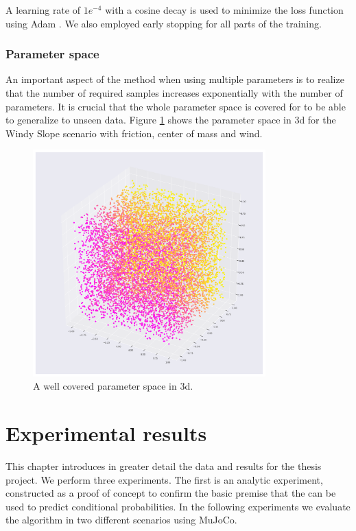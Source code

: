 A learning rate of $1e^{-4}$ with a cosine decay is used to minimize the loss function using Adam \parencite{kingma2014adam}. We also employed early stopping for all parts of the training.

\subsection{Parameter space}

An important aspect of the method when using multiple parameters is to realize that the number of required samples increases exponentially with the number of parameters. It is crucial that the whole parameter space is covered for \dettostoc{} to be able to generalize to unseen data. Figure \ref{fig_parameter_space_3d} shows the parameter space in 3d for the Windy Slope scenario with friction, center of mass and wind.

\begin{figure}
\begin{center}
\includegraphics[width=0.8\textwidth]{img/parameter_space_3d}
\caption{A well covered parameter space in 3d.}
\label{fig_parameter_space_3d}
\end{center}
\end{figure}

\chapter{Experimental results}
\label{experiments}

This chapter introduces in greater detail the data and results for the thesis project. We perform three experiments. The first is an analytic experiment, constructed as a proof of concept to confirm the basic premise that the \cvae{} can be used to predict conditional probabilities. In the following experiments we evaluate the \dettostoc{} algorithm in two different scenarios using MuJoCo.

